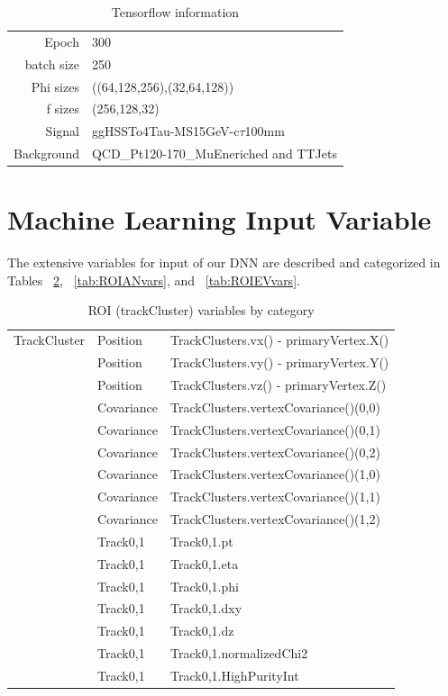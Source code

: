 \begin{table}[htb]
\caption{Tensorflow information}
\begin{center}
\begin{tabular}{r|l}\hline
Epoch & 300 \\
batch size & 250 \\
Phi sizes & ((64,128,256),(32,64,128)) \\
f sizes & (256,128,32) \\
Signal & ggHSSTo4Tau-MS15GeV-c$\tau$100mm  \\
Background & QCD\_Pt120-170\_MuEneriched and TTJets \\
 \hline
 \hline
\end{tabular}
\label{tab:ROIParam}
\end{center}
\end{table}


\section{Machine Learning Input Variable}\label{sec:MLIV}
The extensive variables for input of our DNN are described and categorized in Tables ~\ref{tab:ROITCvars}, ~\ref{tab:ROIANvars}, and ~\ref{tab:ROIEVvars}.

\begin{table}[htb]
\caption{ROI (trackCluster) variables by category}
\begin{center}
\begin{tabular}{r|l|l}\hline
 TrackCluster & Position & TrackClusters.vx() - primaryVertex.X() \\
              & Position & TrackClusters.vy() - primaryVertex.Y() \\
              & Position & TrackClusters.vz() - primaryVertex.Z() \\
              & Covariance & TrackClusters.vertexCovariance()(0,0) \\
              & Covariance & TrackClusters.vertexCovariance()(0,1) \\
              & Covariance & TrackClusters.vertexCovariance()(0,2) \\
              & Covariance & TrackClusters.vertexCovariance()(1,0) \\
              & Covariance & TrackClusters.vertexCovariance()(1,1) \\
              & Covariance & TrackClusters.vertexCovariance()(1,2) \\
              & Track0,1 & Track0,1.pt \\
              & Track0,1 & Track0,1.eta \\
              & Track0,1 & Track0,1.phi \\
              & Track0,1 & Track0,1.dxy \\
              & Track0,1 & Track0,1.dz \\
              & Track0,1 & Track0,1.normalizedChi2 \\
              & Track0,1 & Track0,1.HighPurityInt \\
 \hline
 \hline
\end{tabular}
\label{tab:ROITCvars}
\end{center}
\end{table}


